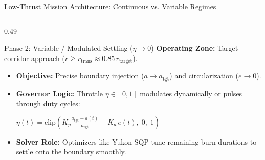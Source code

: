 \documentclass[aspectratio=169, 10pt]{beamer}
\begin{document}
\begin{frame}{Low-Thrust Mission Architecture: Continuous vs. Variable Regimes}
\begin{columns}[T]
        \begin{column}{0.49\textwidth}
            \begin{exampleblock}{Phase 2: Variable / Modulated Settling ($\eta \to 0$)}
                \scriptsize
                \textbf{Operating Zone:} Target corridor approach ($r \ge r_{\text{trans}} \approx 0.85\, r_{\text{target}}$).
                \begin{itemize}\setlength{\itemsep}{1.5pt}\setlength{\topsep}{1pt}
                    \item \textbf{Objective:} Precise boundary injection ($a \to a_{\text{tgt}}$) and circularization ($e \to 0$).
                    \item \textbf{Governor Logic:} Throttle $\eta \in [0, 1]$ modulates dynamically or pulses through duty cycles:
                    \par\vspace{1pt}
                    {\centering $\displaystyle \eta(t) = \text{clip}\left(K_p \frac{a_{\text{tgt}} - a(t)}{a_{\text{tgt}}} - K_d \, e(t), \; 0, \; 1\right)$ \par}
                    \item \textbf{Solver Role:} Optimizers like Yukon SQP tune remaining burn durations to settle onto the boundary smoothly.
                \end{itemize}
            \end{exampleblock}
            \centering
        \end{column}
    \end{columns}
\end{frame}
\end{document}
